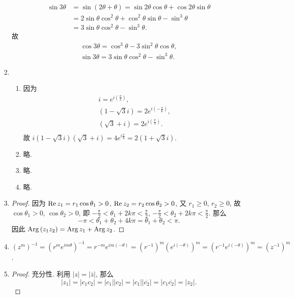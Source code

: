 \begin{enumerate}
\begin{align*}
        \sin{3\theta} &= \sin(2\theta + \theta) = \sin{2\theta}\cos\theta + \cos{2\theta}\sin\theta \\
        &= 2\sin\theta\cos^2\theta + \cos^2\theta\sin\theta - \sin^3\theta \\
        &= 3\sin\theta\cos^2\theta - \sin^3\theta.
    \end{align*}
    故 \begin{gather*}
        \cos{3\theta} = \cos^3\theta - 3\sin^2\theta\cos\theta, \\
        \sin{3\theta} = 3\sin\theta\cos^2\theta - \sin^3\theta.
    \end{gather*}
\item %
    \begin{enumerate}
        \item 因为 \begin{gather*}
            i = e^{i(\frac{\pi}{2})}, \\
            (1-\sqrt{3}i) = 2e^{i(-\frac{\pi}{6})}, \\
            (\sqrt{3} + i) = 2e^{i(\frac\pi3)}. \\
        \end{gather*}
        故 $i(1-\sqrt{3}i)(\sqrt{3} + i) = 4e^{i\frac{\pi}{6}} = 2(1+\sqrt{3}i)$.
        \item 略.
        \item 略.
        \item 略.
    \end{enumerate}
\item %
    \begin{proof}
        因为 $\mathrm{Re}\,{z_1} = r_1\cos\theta_1 > 0$, $\mathrm{Re}\,{z_2} = r_2\cos\theta_2 > 0$, 又 $r_1 \geqslant 0$, $r_2 \geqslant 0$,
        故 $\cos\theta_1 > 0$, $\cos\theta_2 > 0$, 即 $-\frac\pi2 < \theta_1 + 2k\pi < \frac\pi2$, $-\frac\pi2 < \theta_2 + 2k\pi < \frac\pi2$.
        那么 \[
            -\pi < \theta_1 + \theta_2 + 4k\pi = \theta_1 + \theta_2 < \pi.   
        \]
        因此 $\mathrm{Arg}\,(z_1z_2) = \mathrm{Arg}\,{z_1} + \mathrm{Arg}\,{z_2}$. 
    \end{proof}
\item %
    $\displaystyle{
        (z^m)^{-1} = (r^me^{im\theta})^{-1} = r^{-m}e^{im(-\theta)} = (r^{-1})^m(e^{i(-\theta)})^m = (r^{-1}e^{i(-\theta)})^m = (z^{-1})^m
    }$.
\item %
    \begin{proof}
        充分性. 利用 $|z| = |\overline{z}|$, 那么
        \[
            |z_1| = |c_1c_2| = |c_1||c_2| = |c_1||\overline{c_2}| = |c_1\overline{c_2}| = |z_2|.    
\]
\end{proof}
\end{enumerate}
